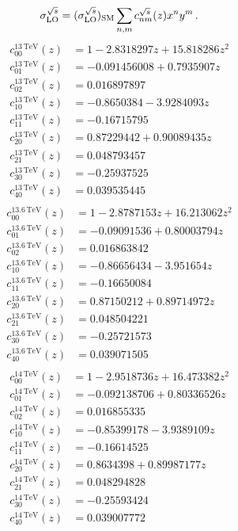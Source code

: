 \begin{equation}
\sigma_{\rm LO}^{\sqrt{s}}=(\sigma_{\rm LO}^{\sqrt{s}})_{\rm SM}
\sum_{n,m}c_{nm}^{\sqrt{s}}(z)x^n y^m\,.
\end{equation}
\begin{align}
c_{00}^{13\,\mathrm{TeV}}(z) &= 1 -2.8318297z +15.818286z^2 \\
c_{01}^{13\,\mathrm{TeV}}(z) &= -0.091456008 +0.7935907z \\
c_{02}^{13\,\mathrm{TeV}}(z) &= 0.016897897 \\
c_{10}^{13\,\mathrm{TeV}}(z) &= -0.8650384 -3.9284093z \\
c_{11}^{13\,\mathrm{TeV}}(z) &= -0.16715795 \\
c_{20}^{13\,\mathrm{TeV}}(z) &= 0.87229442 +0.90089435z \\
c_{21}^{13\,\mathrm{TeV}}(z) &= 0.048793457 \\
c_{30}^{13\,\mathrm{TeV}}(z) &= -0.25937525 \\
c_{40}^{13\,\mathrm{TeV}}(z) &= 0.039535445 \\
\end{align}
\begin{align}
c_{00}^{13.6\,\mathrm{TeV}}(z) &= 1 -2.8787153z +16.213062z^2 \\
c_{01}^{13.6\,\mathrm{TeV}}(z) &= -0.09091536 +0.80003794z \\
c_{02}^{13.6\,\mathrm{TeV}}(z) &= 0.016863842 \\
c_{10}^{13.6\,\mathrm{TeV}}(z) &= -0.86656434 -3.951654z \\
c_{11}^{13.6\,\mathrm{TeV}}(z) &= -0.16650084 \\
c_{20}^{13.6\,\mathrm{TeV}}(z) &= 0.87150212 +0.89714972z \\
c_{21}^{13.6\,\mathrm{TeV}}(z) &= 0.048504221 \\
c_{30}^{13.6\,\mathrm{TeV}}(z) &= -0.25721573 \\
c_{40}^{13.6\,\mathrm{TeV}}(z) &= 0.039071505 \\
\end{align}
\begin{align}
c_{00}^{14\,\mathrm{TeV}}(z) &= 1 -2.9518736z +16.473382z^2 \\
c_{01}^{14\,\mathrm{TeV}}(z) &= -0.092138706 +0.80336526z \\
c_{02}^{14\,\mathrm{TeV}}(z) &= 0.016855335 \\
c_{10}^{14\,\mathrm{TeV}}(z) &= -0.85399178 -3.9389109z \\
c_{11}^{14\,\mathrm{TeV}}(z) &= -0.16614525 \\
c_{20}^{14\,\mathrm{TeV}}(z) &= 0.8634398 +0.89987177z \\
c_{21}^{14\,\mathrm{TeV}}(z) &= 0.048294828 \\
c_{30}^{14\,\mathrm{TeV}}(z) &= -0.25593424 \\
c_{40}^{14\,\mathrm{TeV}}(z) &= 0.039007772 \\
\end{align}
